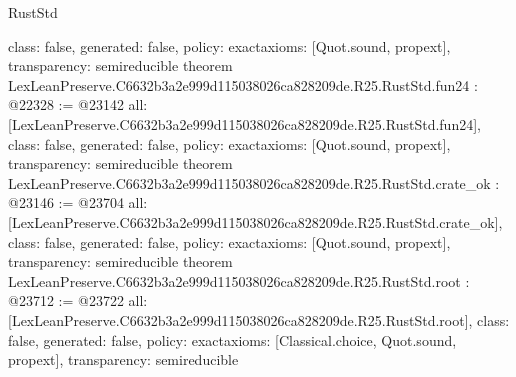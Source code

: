 \begin{lexlean}{RustStd}
\begin{coremodule}
{  class: false,
  generated: false,
  policy: exact{axioms: [Quot.sound, propext]},
  transparency: semireducible
}
theorem LexLeanPreserve.C6632b3a2e999d115038026ca828209de.R25.RustStd.fun24 : @22328 := @23142 {
  all: [LexLeanPreserve.C6632b3a2e999d115038026ca828209de.R25.RustStd.fun24],
  class: false,
  generated: false,
  policy: exact{axioms: [Quot.sound, propext]},
  transparency: semireducible
}
theorem LexLeanPreserve.C6632b3a2e999d115038026ca828209de.R25.RustStd.crate_ok : @23146 := @23704 {
  all: [LexLeanPreserve.C6632b3a2e999d115038026ca828209de.R25.RustStd.crate_ok],
  class: false,
  generated: false,
  policy: exact{axioms: [Quot.sound, propext]},
  transparency: semireducible
}
theorem LexLeanPreserve.C6632b3a2e999d115038026ca828209de.R25.RustStd.root : @23712 := @23722 {
  all: [LexLeanPreserve.C6632b3a2e999d115038026ca828209de.R25.RustStd.root],
  class: false,
  generated: false,
  policy: exact{axioms: [Classical.choice, Quot.sound, propext]},
  transparency: semireducible
}


\end{coremodule}
\end{lexlean}
